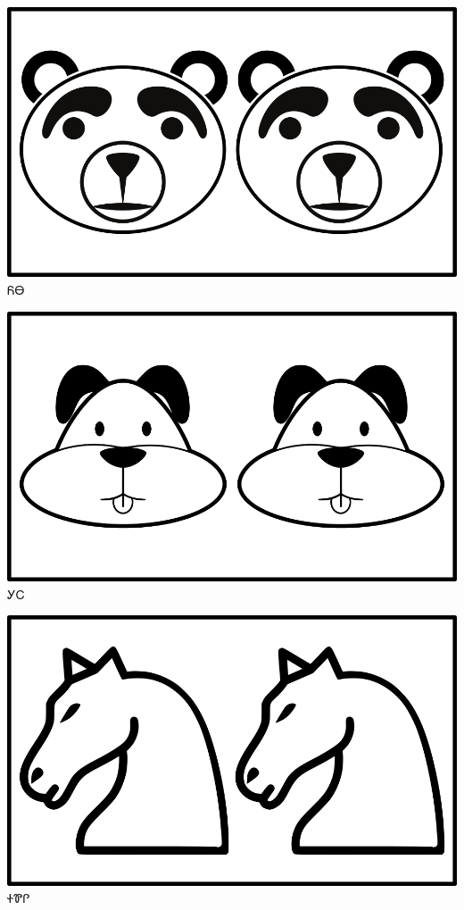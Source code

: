 \documentclass[avery5371]{flashcards}%
\begin{document}
\begin{flashcard}{
\includegraphics[width=0.95\columnwidth,height=.51\columnwidth,keepaspectratio]{../artwork/objects-animate/anitali-yona}
}\Huge ᏲᎾ
\end{flashcard}

\begin{flashcard}{
\includegraphics[width=0.95\columnwidth,height=.51\columnwidth,keepaspectratio]{../artwork/objects-animate/anitali-gihli}
}\Huge ᎩᏟ
\end{flashcard}

\begin{flashcard}{
\includegraphics[width=0.95\columnwidth,height=.51\columnwidth,keepaspectratio]{../artwork/objects-animate/anitali-soquili}
}\Huge ᏐᏈᎵ
\end{flashcard}
\end{document}
